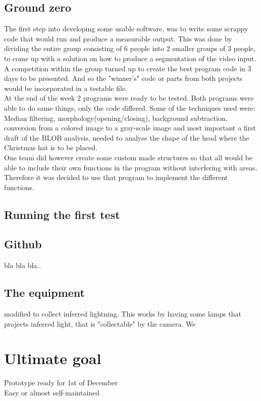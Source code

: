\subsection{Ground zero}
The first step into developing some usable software, was to write some scrappy code that would run and produce a measurable output. This was done by dividing the entire group consisting of 6 people into 2 smaller groups of 3 people, to come up with a solution on how to produce a segmentation of the video input. A competition within the group turned up to create the best program code in 3 days to be presented. And so the "winner's" code or parts from both projects would be incorporated in a testable file.\\
At the end of the week 2 programs were ready to be tested. Both programs were able to do same things, only the code differed. Some of the techniques used were: Median filtering, morphology(opening/closing), background subtraction, conversion from a colored image to a gray-scale image and most important a first draft of the BLOB analysis, needed to analyse the shape of the head where the Christmas hat is to be placed.\\
One team did however create some custom made structures so that all would be able to include their own functions in the program without interfering with areas. Therefore it was decided to use that program to implement the different functions.

\subsection{Running the first test}


\subsection{Github}
bla bla bla..

\subsection{The equipment} 
modified to collect inferred lightning. This works by having some lamps that projects inferred light, that is "collectable" by the camera. We 

\section{Ultimate goal}
Prototype ready for 1st of December\\
Easy or almost self-maintained
